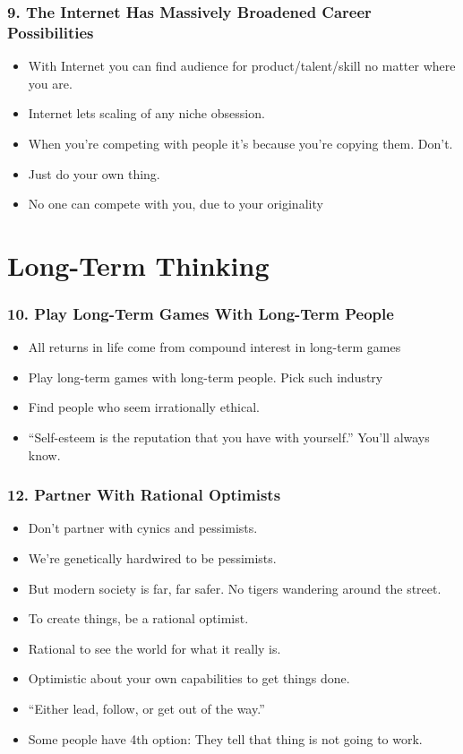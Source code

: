 \begin{frame}[fragile]
\frametitle{9. The Internet Has Massively Broadened Career Possibilities}
\begin{itemize}
\item With Internet you can find audience for product/talent/skill no matter where you are.
\item Internet lets scaling of any niche obsession.
\item When you're competing with people it's because you're copying them. Don't.  
\item Just do your own thing.
\item No one can compete with you, due to your originality
\end{itemize}
\end{frame}


\section{Long-Term Thinking}

\begin{frame}[fragile]
\frametitle{10. Play Long-Term Games With Long-Term People}
\begin{itemize}
\item All returns in life come from compound interest in long-term games
\item Play long-term games with long-term people. Pick such industry
\item Find people who seem irrationally ethical.
\item ``Self-esteem is the reputation that you have with yourself.'' You'll always know.
\end{itemize}
\end{frame}

\begin{frame}[fragile]
\frametitle{12. Partner With Rational Optimists}
\begin{itemize}
\item Don't partner with cynics and pessimists.
\item We're genetically hardwired to be pessimists. 
\item But modern society is far, far safer. No tigers wandering around the street.
\item To create things, be a rational optimist. 
\item Rational to see the world for what it really is. 
\item Optimistic about your own capabilities to get things done.
\item``Either lead, follow, or get out of the way.'' 
\item Some people have 4th option: They tell that thing is not going to work.
\end{itemize}
\end{frame}

